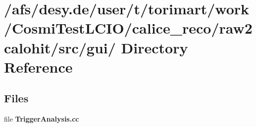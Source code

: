 \section{/afs/desy.de/user/t/torimart/work/CosmiTestLCIO/calice\_\-reco/raw2calohit/src/gui/ Directory Reference}
\label{dir_781ef212096d190524ad107c7e0e11c4}
\subsection*{Files}
\begin{DoxyCompactItemize}
\item 
file {\bfseries TriggerAnalysis.cc}
\end{DoxyCompactItemize}
